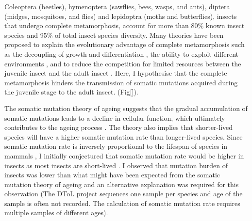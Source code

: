 Coleoptera (beetles), hymenoptera (sawflies, bees, wasps, and ants), diptera (midges, mosquitoes, and flies) and lepidoptra (moths and butterflies), insects that undergo complete metamorphosis, account for more than 80\% known insect species and 95\% of total insect species diversity. Many theories have been proposed to explain the evolutionary advantage of complete metamorphosis such as the decoupling of growth and differentiation \cite{}, the ability to exploit different environments \cite{}, and to reduce the competition for limited resources between the juvenile insect and the adult insect \cite{}. Here, I hypothesise that the complete metamorphosis hinders the transmission of somatic mutations acquired during the juvenile stage to the adult insect. (Fig\ref{}).

The somatic mutation theory of ageing suggests that the gradual accumulation of somatic mutations leads to a decline in cellular function, which ultimately contributes to the ageing process \cite{}. The theory also implies that shorter-lived species will have a higher somatic mutation rate than longer-lived species. Since somatic mutation rate is inversely proportional to the lifespan of species in mammals \cite{}, I initially conjectured that somatic mutation rate would be higher in insects as most insects are short-lived \cite{}. I observed that mutation burden of insects was lower than what might have been expected from the somatic mutation theory of ageing and an alternative explanation was required for this observation (The DToL project sequences one sample per species and age of the sample is often not recorded. The calculation of somatic mutation rate requires multiple samples of different ages). 

